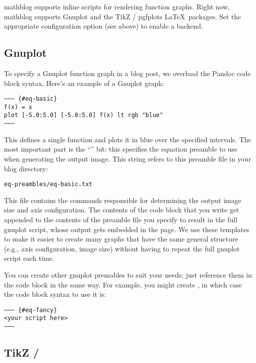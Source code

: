\documentclass[11pt, letterpaper, oneside, titlepage]{book}
\begin{document}
mathblog supports inline scripts for rendering function graphs.  Right
now, mathblog supports Gnuplot and the TikZ / pgfplots
\LaTeX\ packages.  Set the appropriate configuration option (see
above) to enable a backend.

\subsection{Gnuplot}

To specify a Gnuplot function graph in a blog post, we overload the
Pandoc code block syntax.  Here's an example of a Gnuplot graph:

\begin{verbatim}
~~~ {#eq-basic}
f(x) = x
plot [-5.0:5.0] [-5.0:5.0] f(x) lt rgb "blue"
~~~
\end{verbatim}

This defines a single function and plots it in blue over the specified
intervals.  The most important part is the ``'' bit:
this specifies the equation preamble to use when generating the output
image.  This string refers to this preamble file in your blog
directory:

\begin{verbatim}
eq-preambles/eq-basic.txt
\end{verbatim}

This file contains the commands responsible for determining the output
image size and axis configuration.  The contents of the code block
that you write get appended to the contents of the preamble file you
specify to result in the full gnuplot script, whose output gets
embedded in the page.  We use these templates to make it easier to
create many graphs that have the same general structure (e.g., axis
configuration, image size) without having to repeat the full gnuplot
script each time.

You can create other gnuplot premables to suit your needs; just
reference them in the code block in the same way.  For example, you
might create , in which case the code
block syntax to use it is:

\begin{verbatim}
~~~ {#eq-fancy}
<your script here>
~~~
\end{verbatim}

\subsection{TikZ / }
\end{document}
